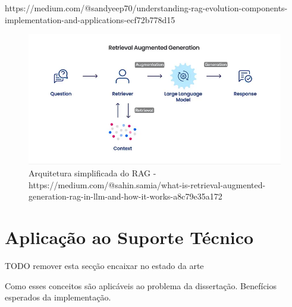 https://medium.com/@sandyeep70/understanding-rag-evolution-components-implementation-and-applications-ecf72b778d15

\begin{figure}[H]
        \centering
        \includegraphics[width=1\linewidth]{ch2/assets/RAG-ach-2.png
        }
        \caption{Arquitetura simplificada do RAG - https://medium.com/@sahin.samia/what-is-retrieval-augmented-generation-rag-in-llm-and-how-it-works-a8c79e35a172}
        \label{fig:acrh-embedding}
\end{figure}


\section{Aplicação ao Suporte Técnico}

TODO remover esta secção encaixar no estado da arte

Como esses conceitos são aplicáveis ao problema da dissertação.
Benefícios esperados da implementação.
